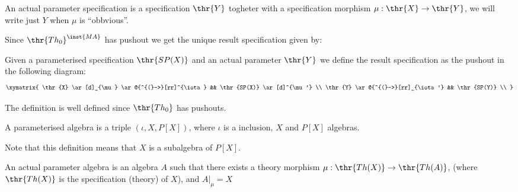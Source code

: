 \begin{definition}
An actual parameter specification is a specification $\thr{Y}$ togheter with a specification morphism $\mu: \thr{X} \to \thr{Y}$, we will write just $Y$ when $\mu$ is ``obbvious''.
\end{definition}

Since $\thr{Th_0}^{\inst{MA}}$ has pushout we get the unique result specification given by:

\begin{definition}
Given a parameterised specification $\thr{SP(X)}$ and an actual parameter $\thr{Y}$ we define the result specification as the pushout in the following diagram:
\[\xymatrix{
	\thr{X} \ar[d]_{\mu} \ar@{^{(}->}[rr]^{\iota}
		&& \thr{SP(X)} \ar[d]^{\mu'}	\\
	\thr{Y} \ar@{^{(}->}[rr]_{\iota'}
		&& \thr{SP(Y)} 	\\								}
\]
\end{definition}

\begin{fact}
The definition is well defined since $\thr{Th_0}$ has pushouts.
\end{fact}

\begin{definition}
A parameterised algebra is a triple $(\iota,X, P[X])$, where $\iota$ is a inclusion, $X$ and $P[X]$ algebras. 
\end{definition}

Note that this definition means that $X$ is a subalgebra of $P[X]$.
\begin{definition}
An actual parameter algebra is an algebra $A$ such that there exists a theory morphism $\mu:\thr{Th(X)} \to \thr{Th(A)}$, (where $\thr{Th(X)}$ is the specification (theory) of $X$), and $A|_{\mu} = X$
\end{definition}




